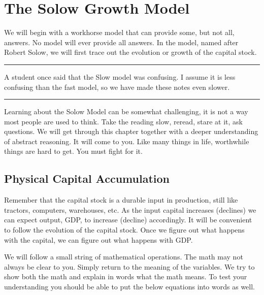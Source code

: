 \documentclass[
]{book}
\begin{document}
\hypertarget{the-solow-growth-model}{%
\section{The Solow Growth Model}\label{the-solow-growth-model}}

We will begin with a workhorse model that can provide some, but not all, answers. No model will ever provide all answers. In the model, named after Robert Solow, we will first trace out the evolution or growth of the capital stock.

\begin{center}\rule{0.5\linewidth}{0.5pt}\end{center}

A student once said that the Slow model was confusing. I assume it is less confusing than the fast model, so we have made these notes even slower.

\begin{center}\rule{0.5\linewidth}{0.5pt}\end{center}

Learning about the Solow Model can be somewhat challenging, it is not a way most people are used to think. Take the reading slow, reread, stare at it, ask questions. We will get through this chapter together with a deeper understanding of abstract reasoning. It will come to you. Like many things in life, worthwhile things are hard to get. You must fight for it.

\hypertarget{physical-capital-accumulation}{%
\subsection{Physical Capital Accumulation}\label{physical-capital-accumulation}}

Remember that the capital stock is a durable input in production, still like tractors, computers, warehouses, etc. As the input capital increases (declines) we can expect output, GDP, to increase (decline) accordingly. It will be convenient to follow the evolution of the capital stock. Once we figure out what happens with the capital, we can figure out what happens with GDP.

We will follow a small string of mathematical operations. The math may not always be clear to you. Simply return to the meaning of the variables. We try to show both the math and explain in words what the math means. To test your understanding you should be able to put the below equations into words as well.
\end{document}
